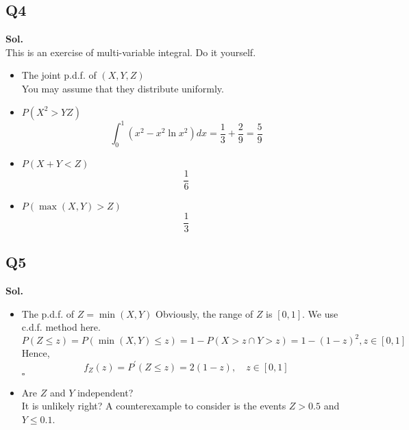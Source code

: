 \documentclass[12pt]{article}
\begin{document}
\subsection*{Q4}
\textbf{Sol.}\\ 
   This is an exercise of multi-variable integral. Do it yourself. 
\begin{itemize}
    \item The joint p.d.f. of \((X,Y,Z)\) \\
    You may assume that they distribute uniformly. 
    \item \(P(X^{2}  > YZ)\)
    \[
      \int_0^1 (x^2 - x^2\ln{x^2}) dx =  \frac{1}{3} + \frac{2}{9} = \frac{5}{9}
    \]
    \item \(P(X+Y < Z)\)
    \[
      \frac{1}{6}
    \]
    \item \(P(\max{(X,Y)} > Z)\)   
    \[
      \frac{1}{3}
    \]
\end{itemize}

\subsection*{Q5}
\textbf{Sol.}\\ 
\begin{itemize}
    \item The p.d.f. of \(Z = \min{(X,Y)}\) 
    Obviously, the range of \(Z\) is \([0,1]\).
    We use c.d.f. method here. 
    \[
      P(Z \leq z) = P(\min{(X,Y)} \leq z) = 1 - P(X > z \cap Y > z) = 1 - (1-z)^2, z \in [0,1]
    \]
    Hence, 
    \[
      f_Z(z) = P^\prime(Z \leq z) = 2(1-z), \quad z \in [0,1]
    \]
    \hspace{\textwidth} \(\square\) 
    \item Are \(Z\) and \(Y\) independent?\\ 
    It is unlikely right? A counterexample to consider is the events \(Z > 0.5\) and \(Y \leq 0.1\).  
\end{itemize}
\end{document}
